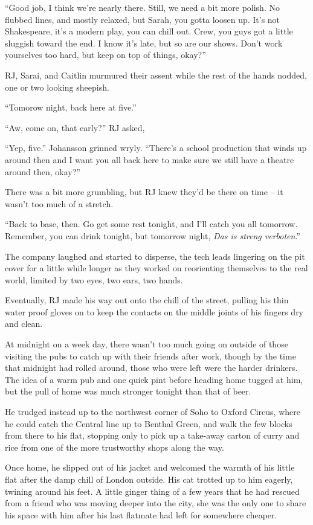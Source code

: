 ``Good job, I think we're nearly there.  Still, we need a bit more polish.  No flubbed lines, and mostly relaxed, but Sarah, you gotta loosen up.  It's not Shakespeare, it's a modern play, you can chill out.  Crew, you guys got a little sluggish toward the end.  I know it's late, but so are our shows.  Don't work yourselves too hard, but keep on top of things, okay?''

RJ, Sarai, and Caitlin murmured their assent while the rest of the hands nodded, one or two looking sheepish.

``Tomorow night, back here at five.''

``Aw, come on, that early?'' RJ asked,

``Yep, five.''  Johansson grinned wryly.  ``There's a school production that winds up around then and I want you all back here to make sure we still have a theatre around then, okay?''

There was a bit more grumbling, but RJ knew they'd be there on time -- it wasn't too much of a stretch.

``Back to base, then.  Go get some rest tonight, and I'll catch you all tomorrow.  Remember, you can drink tonight, but tomorrow night, \textit{Das is streng verboten}.''

The company laughed and started to disperse, the tech leads lingering on the pit cover for a little while longer as they worked on reorienting themselves to the real world, limited by two eyes, two ears, two hands.

Eventually, RJ made his way out onto the chill of the street, pulling his thin water proof gloves on to keep the contacts on the middle joints of his fingers dry and clean.

At midnight on a week day, there wasn't too much going on outside of those visiting the pubs to catch up with their friends after work, though by the time that midnight had rolled around, those who were left were the harder drinkers.  The idea of a warm pub and one quick pint before heading home tugged at him, but the pull of home was much stronger tonight than that of beer.

He trudged instead up to the northwest corner of Soho to Oxford Circus, where he could catch the Central line up to Benthal Green, and walk the few blocks from there to his flat, stopping only to pick up a take-away carton of curry and rice from one of the more trustworthy shops along the way.

Once home, he slipped out of his jacket and welcomed the warmth of his little flat after the damp chill of London outside.  His cat trotted up to him eagerly, twining around his feet.  A little ginger thing of a few years that he had rescued from a friend who was moving deeper into the city, she was the only one to share his space with him after his last flatmate had left for somewhere cheaper.

